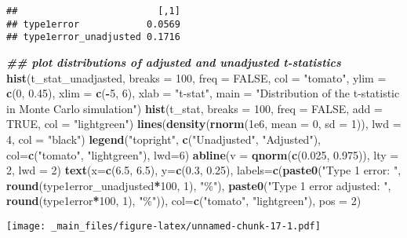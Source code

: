 \documentclass[
]{book}
\newenvironment{Shaded}{\begin{snugshade}}{\end{snugshade}}
\newcommand{\AttributeTok}[1]{\textcolor[rgb]{0.13,0.29,0.53}{#1}}
\newcommand{\ConstantTok}[1]{\textcolor[rgb]{0.56,0.35,0.01}{#1}}
\newcommand{\DecValTok}[1]{\textcolor[rgb]{0.00,0.00,0.81}{#1}}
\newcommand{\DocumentationTok}[1]{\textcolor[rgb]{0.56,0.35,0.01}{\textbf{\textit{#1}}}}
\newcommand{\FloatTok}[1]{\textcolor[rgb]{0.00,0.00,0.81}{#1}}
\newcommand{\FunctionTok}[1]{\textcolor[rgb]{0.13,0.29,0.53}{\textbf{#1}}}
\newcommand{\NormalTok}[1]{#1}
\newcommand{\SpecialCharTok}[1]{\textcolor[rgb]{0.81,0.36,0.00}{\textbf{#1}}}
\newcommand{\StringTok}[1]{\textcolor[rgb]{0.31,0.60,0.02}{#1}}
\begin{document}
\begin{verbatim}
##                         [,1]
## type1error            0.0569
## type1error_unadjusted 0.1716
\end{verbatim}

\begin{Shaded}
\begin{Highlighting}[]
\DocumentationTok{\#\# plot distributions of adjusted and unadjusted t{-}statistics}
\FunctionTok{hist}\NormalTok{(t\_stat\_unadjasted, }\AttributeTok{breaks =} \DecValTok{100}\NormalTok{, }\AttributeTok{freq =} \ConstantTok{FALSE}\NormalTok{, }\AttributeTok{col =} \StringTok{"tomato"}\NormalTok{, }
     \AttributeTok{ylim =} \FunctionTok{c}\NormalTok{(}\DecValTok{0}\NormalTok{, }\FloatTok{0.45}\NormalTok{), }\AttributeTok{xlim =} \FunctionTok{c}\NormalTok{(}\SpecialCharTok{{-}}\DecValTok{5}\NormalTok{, }\DecValTok{6}\NormalTok{), }\AttributeTok{xlab =} \StringTok{"t{-}stat"}\NormalTok{, }
     \AttributeTok{main =} \StringTok{"Distribution of the t{-}statistic in Monte Carlo simulation"}\NormalTok{)}
\FunctionTok{hist}\NormalTok{(t\_stat, }\AttributeTok{breaks =} \DecValTok{100}\NormalTok{, }\AttributeTok{freq =} \ConstantTok{FALSE}\NormalTok{, }\AttributeTok{add =} \ConstantTok{TRUE}\NormalTok{, }\AttributeTok{col =} \StringTok{"lightgreen"}\NormalTok{)}
\FunctionTok{lines}\NormalTok{(}\FunctionTok{density}\NormalTok{(}\FunctionTok{rnorm}\NormalTok{(}\FloatTok{1e6}\NormalTok{, }\AttributeTok{mean =} \DecValTok{0}\NormalTok{, }\AttributeTok{sd =} \DecValTok{1}\NormalTok{)), }\AttributeTok{lwd =} \DecValTok{4}\NormalTok{, }\AttributeTok{col =} \StringTok{"black"}\NormalTok{)}
\FunctionTok{legend}\NormalTok{(}\StringTok{"topright"}\NormalTok{, }\FunctionTok{c}\NormalTok{(}\StringTok{"Unadjusted"}\NormalTok{, }\StringTok{"Adjusted"}\NormalTok{), }\AttributeTok{col=}\FunctionTok{c}\NormalTok{(}\StringTok{"tomato"}\NormalTok{, }\StringTok{"lightgreen"}\NormalTok{), }\AttributeTok{lwd=}\DecValTok{6}\NormalTok{)}
\FunctionTok{abline}\NormalTok{(}\AttributeTok{v =} \FunctionTok{qnorm}\NormalTok{(}\FunctionTok{c}\NormalTok{(}\FloatTok{0.025}\NormalTok{, }\FloatTok{0.975}\NormalTok{)), }\AttributeTok{lty =} \DecValTok{2}\NormalTok{, }\AttributeTok{lwd =} \DecValTok{2}\NormalTok{)}
\FunctionTok{text}\NormalTok{(}\AttributeTok{x=}\FunctionTok{c}\NormalTok{(}\FloatTok{6.5}\NormalTok{, }\FloatTok{6.5}\NormalTok{), }\AttributeTok{y=}\FunctionTok{c}\NormalTok{(}\FloatTok{0.3}\NormalTok{, }\FloatTok{0.25}\NormalTok{), }
     \AttributeTok{labels=}\FunctionTok{c}\NormalTok{(}\FunctionTok{paste0}\NormalTok{(}\StringTok{"Type 1 error: "}\NormalTok{, }\FunctionTok{round}\NormalTok{(type1error\_unadjusted}\SpecialCharTok{*}\DecValTok{100}\NormalTok{, }\DecValTok{1}\NormalTok{), }\StringTok{"\%"}\NormalTok{),}
              \FunctionTok{paste0}\NormalTok{(}\StringTok{"Type 1 error adjusted: "}\NormalTok{, }\FunctionTok{round}\NormalTok{(type1error}\SpecialCharTok{*}\DecValTok{100}\NormalTok{, }\DecValTok{1}\NormalTok{), }\StringTok{"\%"}\NormalTok{)), }
     \AttributeTok{col=}\FunctionTok{c}\NormalTok{(}\StringTok{"tomato"}\NormalTok{, }\StringTok{"lightgreen"}\NormalTok{), }\AttributeTok{pos =} \DecValTok{2}\NormalTok{)}
\end{Highlighting}
\end{Shaded}

\texttt{[image: \_main\_files/figure-latex/unnamed-chunk-17-1.pdf]}

  
\end{document}
